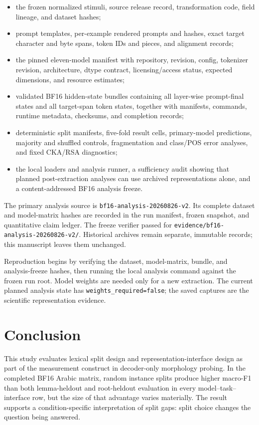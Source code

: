 \documentclass[pdflatex,sn-basic]{sn-jnl}
\newcommand{\bfana}{\texttt{bf16-analysis-20260826-v2}}
\begin{document}
\begin{itemize}
    \item the frozen normalized stimuli, source release record, transformation
    code, field lineage, and dataset hashes;
    \item prompt templates, per-example rendered prompts and hashes, exact
    target character and byte spans, token IDs and pieces, and alignment
    records;
    \item the pinned eleven-model manifest with repository, revision, config,
    tokenizer revision, architecture, dtype contract, licensing/access
    status, expected dimensions, and resource estimates;
    \item validated BF16 hidden-state bundles containing all layer-wise
    prompt-final states and all target-span token states, together with
    manifests, commands, runtime metadata, checksums, and completion records;
    \item deterministic split manifests, five-fold result cells, primary-model
    predictions, majority and shuffled controls, fragmentation and class/POS
    error analyses, and fixed CKA/RSA diagnostics;
    \item the local loaders and analysis runner, a sufficiency audit showing
    that planned post-extraction analyses can use archived representations
    alone, and a content-addressed BF16 analysis freeze.
\end{itemize}

The primary analysis source is \bfana. Its complete dataset and model-matrix
hashes are recorded in the run manifest, frozen snapshot, and quantitative
claim ledger. The freeze verifier passed for
\texttt{evidence/bf16-analysis-20260826-v2/}. Historical archives remain
separate, immutable records; this manuscript leaves them unchanged.

Reproduction begins by verifying the dataset, model-matrix, bundle, and
analysis-freeze hashes, then running the local analysis command against the
frozen run root. Model weights are needed only for a new extraction. The
current planned analysis state has \texttt{weights\_required=false}; the saved
captures are the scientific representation evidence.

\section{Conclusion}

This study evaluates lexical split design and representation-interface design
as part of the measurement construct in decoder-only morphology probing. In
the completed BF16 Arabic matrix, random instance splits produce higher
macro-F1 than both lemma-heldout and root-heldout evaluation in every
model--task--interface row, but the size of that advantage varies materially.
The result supports a condition-specific interpretation of split gaps: split
choice changes the question being answered.
\end{document}
